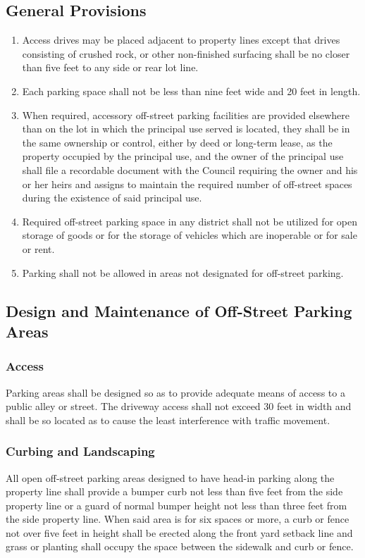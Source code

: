 \subsection{General Provisions}
\begin{enumerate}[{\indent}1)]
    \item Access drives may be placed adjacent to property lines except that drives consisting of crushed rock, or other non-finished surfacing shall be no closer than five feet to any side or rear lot line.
    \item Each parking space shall not be less than nine feet wide and 20 feet in length.
    \item When required, accessory off-street parking facilities are provided elsewhere than on the lot in which the principal use served is located, they shall be in the same ownership or control, either by deed or long-term lease, as the property occupied by the principal use, and the owner of the principal use shall file a recordable document with the Council requiring the owner and his or her heirs and assigns to maintain the required number of off-street spaces during the existence of said principal use.
    \item Required off-street parking space in any district shall not be utilized for open storage of goods or for the storage of vehicles which are inoperable or for sale or rent.
    \item Parking shall not be allowed in areas not designated for off-street parking.
\end{enumerate}
\subsection{Design and Maintenance of Off-Street Parking Areas}
\subsubsection{Access}
Parking areas shall be designed so as to provide adequate means of access to a public alley or street. The driveway access shall not exceed 30 feet in width and shall be so located as to cause the least interference with traffic movement.
\subsubsection{Curbing and Landscaping}
All open off-street parking areas designed to have head-in parking along the property line shall provide a bumper curb not less than five feet from the side property line or a guard of normal bumper height not less than three feet from the side property line.  When said area is for six spaces or more, a curb or fence not over five feet in height shall be erected along the front yard setback line and grass or planting shall occupy the space between the sidewalk and curb or fence.
